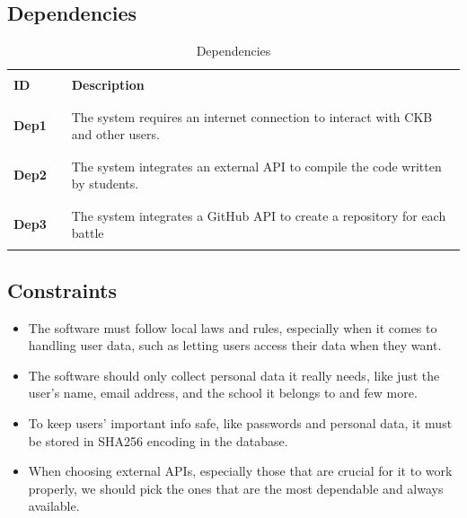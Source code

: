 \subsection{Dependencies}
\begin{table}[H]
    \centering
    \renewcommand{\arraystretch}{0.5}
    \begin{tabular}{l l p{10.5cm}}
        \hline
                      &        &                                                                                                    \\
        \textbf{ID}   & \vline & \textbf{Description}                                                                               \\
                      &        &                                                                                                    \\\hline & & \\
        \textbf{Dep1} & \vline & The system requires an internet connection to interact with CKB and other users.                   \\
                      &        &                                                                                                    \\\hline & & \\
        \textbf{Dep2} & \vline & The system integrates an external API to compile the code written by students.                     \\
                      &        &                                                                                                    \\\hline & & \\
        \textbf{Dep3} & \vline & The system integrates a GitHub API to create a repository for each battle                          \\
                      &        &                                                                                                    \\
        \hline
    \end{tabular}
    \caption{Dependencies}
\end{table}

\subsection{Constraints}
\begin{itemize}
    \item The software must follow local laws and rules, especially when it comes to handling user data, such as letting users access their data when they want.
    \item The software should only collect personal data it really needs, like just the user's name, email address, and the school it belongs to and few more.
    \item To keep users' important info safe, like passwords and personal data, it must be stored in SHA256 encoding in the database.
    \item When choosing external APIs, especially those that are crucial for it to work properly, we should pick the ones that are the most dependable and always available.
\end{itemize}